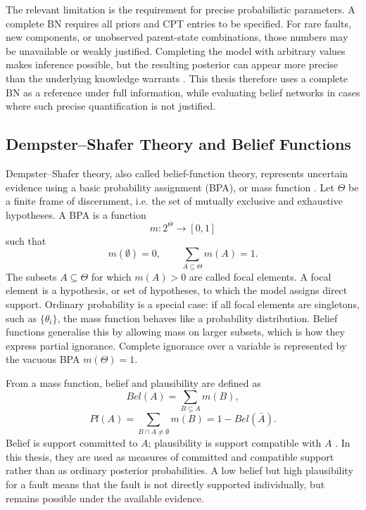 \documentclass[runningheads]{llncs}
\begin{document}
The relevant limitation is the requirement for precise probabilistic parameters. A complete BN requires all priors and CPT entries to be specified. For rare faults, new components, or unobserved parent-state combinations, those numbers may be unavailable or weakly justified. Completing the model with arbitrary values makes inference possible, but the resulting posterior can appear more precise than the underlying knowledge warrants \cite{Shenoy2023IncompleteBN}. This thesis therefore uses a complete BN as a reference under full information, while evaluating belief networks in cases where such precise quantification is not justified.


\subsection{Dempster--Shafer Theory and Belief Functions}
\label{sec:ds_theory}

Dempster--Shafer theory, also called belief-function theory, represents uncertain evidence using a basic probability assignment (BPA), or mass function \cite{Dempster1967,Shafer1976}. Let $\Theta$ be a finite frame of discernment, i.e. the set of mutually exclusive and exhaustive hypotheses. A BPA is a function
\begin{equation}
m:2^\Theta\rightarrow[0,1]
\end{equation}
such that
\begin{equation}
m(\emptyset)=0, \qquad \sum_{A\subseteq\Theta}m(A)=1.
\end{equation}
The subsets $A\subseteq\Theta$ for which $m(A)>0$ are called focal elements. A focal element is a hypothesis, or set of hypotheses, to which the model assigns direct support. Ordinary probability is a special case: if all focal elements are singletons, such as $\{\theta_i\}$, the mass function behaves like a probability distribution. Belief functions generalise this by allowing mass on larger subsets, which is how they express partial ignorance. Complete ignorance over a variable is represented by the vacuous BPA $m(\Theta)=1$.

From a mass function, belief and plausibility are defined as
\begin{equation}
Bel(A)=\sum_{B\subseteq A}m(B),
\end{equation}
\begin{equation}
Pl(A)=\sum_{B\cap A\neq\emptyset}m(B)=1-Bel(\bar{A}).
\end{equation}
Belief is support committed to $A$; plausibility is support compatible with $A$ \cite{Shafer1976,SmetsKennes1994}. In this thesis, they are used as measures of committed and compatible support rather than as ordinary posterior probabilities. A low belief but high plausibility for a fault means that the fault is not directly supported individually, but remains possible under the available evidence.
\end{document}

